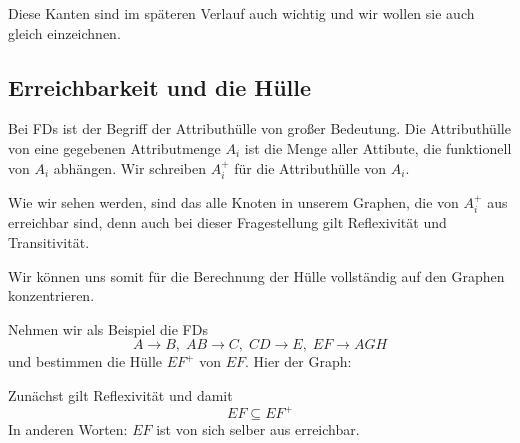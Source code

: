 \documentclass[a4paper, ngerman]{article}
\begin{document}
Diese Kanten sind im späteren Verlauf
auch wichtig und wir wollen sie auch gleich einzeichnen.
\begin{center}
\end{center}

\subsection*{Erreichbarkeit und die Hülle}
Bei FDs ist der Begriff der Attributhülle 
von großer Bedeutung.
Die Attributhülle von eine
gegebenen Attributmenge $A_i$
ist die Menge aller Attibute, 
die funktionell von $A_i$ abhängen.
Wir schreiben $A_i^+$ für die Attributhülle von $A_i$.

Wie wir sehen werden,
sind das alle Knoten in unserem Graphen,
die von $A_i^+$ aus erreichbar sind,
denn auch bei dieser Fragestellung
gilt Reflexivität und Transitivität.

Wir können uns somit für die Berechnung der Hülle
vollständig auf den Graphen konzentrieren.

Nehmen wir als Beispiel die FDs
$$
    A  \to B,\;
    AB \to C,\;
    CD \to E,\;
    EF \to AGH
$$
und bestimmen die Hülle $EF^+$ von $EF$.
Hier der Graph:
\begin{center}
\end{center}
Zunächst gilt Reflexivität und damit
$$
    EF \subseteq EF^+
$$
In anderen Worten: $EF$ ist von sich selber aus erreichbar.
\end{document}
